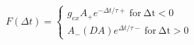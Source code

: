  $F(\Delta t) =  \begin{cases} g_{ex} A_{+} e^{−\Delta t/τ+}\:\mathrm{for\:\Delta t <0}\\A_{-}(DA) e^{\Delta t/τ-}\:\mathrm{for\:\Delta t > 0}\ \end{cases}$
 